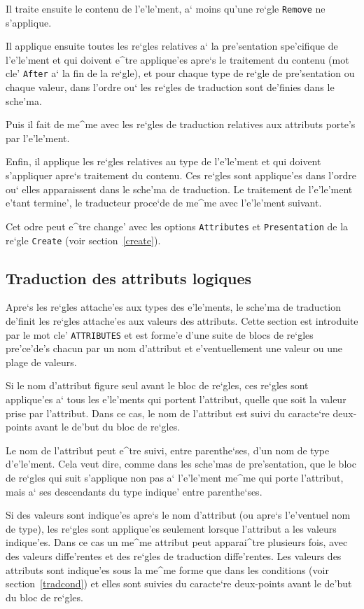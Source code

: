 {Il traite ensuite le contenu de l'e'le'ment, a` moins qu'une re`gle {\tt Remove}
ne s'applique.

Il applique ensuite toutes les re`gles relatives a` la pre'sentation
spe'cifique de l'e'le'ment et qui doivent e^tre applique'es apre`s le
traitement du contenu (mot cle' {\tt After} a` la fin de la re`gle), et pour
chaque type de re`gle de pre'sentation ou chaque valeur, dans l'ordre ou`
les re`gles de traduction sont de'finies dans le sche'ma.

Puis il fait de me^me avec les re`gles de traduction relatives aux attributs
porte's par l'e'le'ment.

Enfin, il applique les re`gles relatives au type de l'e'le'ment et qui doivent
s'appliquer apre`s traitement du contenu. Ces re`gles sont applique'es dans
l'ordre ou` elles apparaissent dans le sche'ma de traduction. Le traitement
de l'e'le'ment e'tant termine', le traducteur proce`de de me^me avec
l'e'le'ment suivant.

Cet odre peut e^tre change' avec les options {\tt Attributes} et
{\tt Presentation} de la re`gle {\tt Create} (voir section~\ref{create}).

\subsection{Traduction des attributs logiques}
\label{tradattr}

Apre`s les re`gles attache'es aux types des e'le'ments, le sche'ma de
traduction de'finit les re`gles attache'es aux valeurs des attributs. Cette
section est introduite par le mot cle' {\tt ATTRIBUTES} et est forme'e d'une
suite de blocs de re`gles pre'ce'de's chacun par un nom d'attribut et
e'ventuellement une valeur ou une plage de valeurs.

Si le nom d'attribut figure seul avant le bloc de re`gles, ces re`gles
sont applique'es a` tous les e'le'ments qui portent l'attribut, quelle
que soit la valeur prise par l'attribut. Dans ce cas, le nom de l'attribut
est suivi du caracte`re deux-points avant le de'but du bloc de re`gles.

Le nom de l'attribut peut e^tre suivi, entre parenthe`ses, d'un nom de type
d'e'le'ment. Cela veut dire, comme dans les sche'mas de pre'sentation, que
le bloc de re`gles qui suit s'applique non pas a` l'e'le'ment me^me qui
porte l'attribut, mais a` ses descendants du type indique' entre parenthe`ses.

Si des valeurs sont indique'es apre`s le nom d'attribut
(ou apre`s l'e'ventuel nom de type), les re`gles sont applique'es seulement
lorsque l'attribut a les valeurs
indique'es. Dans ce cas un me^me attribut peut apparai^tre plusieurs
fois, avec des valeurs diffe'rentes et des re`gles de traduction diffe'rentes.
Les valeurs des attributs sont indique'es sous la me^me forme que dans les
conditions (voir section~\ref{tradcond}) et elles sont suivies du caracte`re
deux-points avant le de'but du bloc de re`gles.

}
